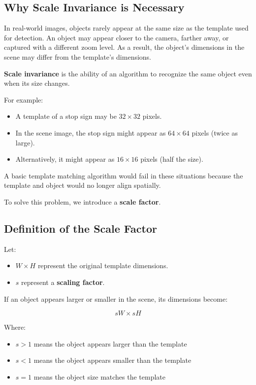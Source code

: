 \documentclass[12pt]{article}
\begin{document}
\subsection{Why Scale Invariance is Necessary}

In real-world images, objects rarely appear at the same size as the template used for detection. An object may appear closer to the camera, farther away, or captured with a different zoom level. As a result, the object's dimensions in the scene may differ from the template's dimensions.

\textbf{Scale invariance} is the ability of an algorithm to recognize the same object even when its size changes.

For example:

\begin{itemize}
    \item A template of a stop sign may be $32 \times 32$ pixels.
    \item In the scene image, the stop sign might appear as $64 \times 64$ pixels (twice as large).
    \item Alternatively, it might appear as $16 \times 16$ pixels (half the size).
\end{itemize}

A basic template matching algorithm would fail in these situations because the template and object would no longer align spatially.

To solve this problem, we introduce a \textbf{scale factor}.

\subsection{Definition of the Scale Factor}

Let:

\begin{itemize}
    \item $W \times H$ represent the original template dimensions.
    \item $s$ represent a \textbf{scaling factor}.
\end{itemize}

If an object appears larger or smaller in the scene, its dimensions become:

\[
    sW \times sH
\]

Where:

\begin{itemize}
    \item $s > 1$ means the object appears larger than the template
    \item $s < 1$ means the object appears smaller than the template
    \item $s = 1$ means the object size matches the template
\end{itemize}
\end{document}
